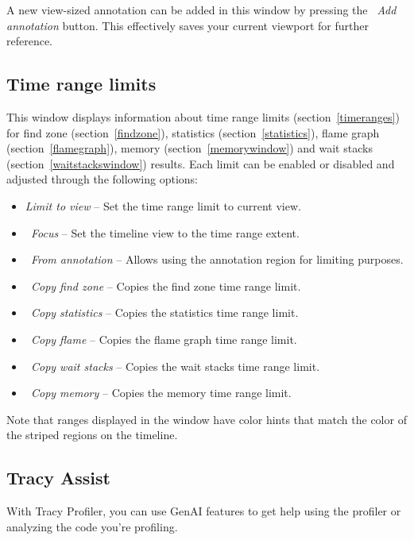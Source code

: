 \documentclass[hidelinks,titlepage,a4paper,twoside]{article}
\begin{document}
A new view-sized annotation can be added in this window by pressing the \emph{\faPlus{}~Add annotation} button. This effectively saves your current viewport for further reference.

\subsection{Time range limits}
\label{timerangelimits}

This window displays information about time range limits (section~\ref{timeranges}) for find zone (section~\ref{findzone}), statistics (section~\ref{statistics}), flame graph (section~\ref{flamegraph}), memory (section~\ref{memorywindow}) and wait stacks (section~\ref{waitstackswindow}) results. Each limit can be enabled or disabled and adjusted through the following options:

\begin{itemize}
\item \emph{Limit to view} -- Set the time range limit to current view.
\item \emph{\faMicroscope{}~Focus} -- Set the timeline view to the time range extent.
\item \emph{\faNoteSticky{}~From annotation} -- Allows using the annotation region for limiting purposes.
\item \emph{\faMagnifyingGlass{}~Copy find zone} -- Copies the find zone time range limit.
\item \emph{\faArrowUpWideShort{}~Copy statistics} -- Copies the statistics time range limit.
\item \emph{\faFireFlameCurved{}~Copy flame} -- Copies the flame graph time range limit.
\item \emph{\faHourglassHalf{}~Copy wait stacks} -- Copies the wait stacks time range limit.
\item \emph{\faMemory{}~Copy memory} -- Copies the memory time range limit.
\end{itemize}

Note that ranges displayed in the window have color hints that match the color of the striped regions on the timeline.

\subsection{Tracy Assist}
\label{tracyassist}

With Tracy Profiler, you can use GenAI features to get help using the profiler or analyzing the code you're profiling.
\end{document}
